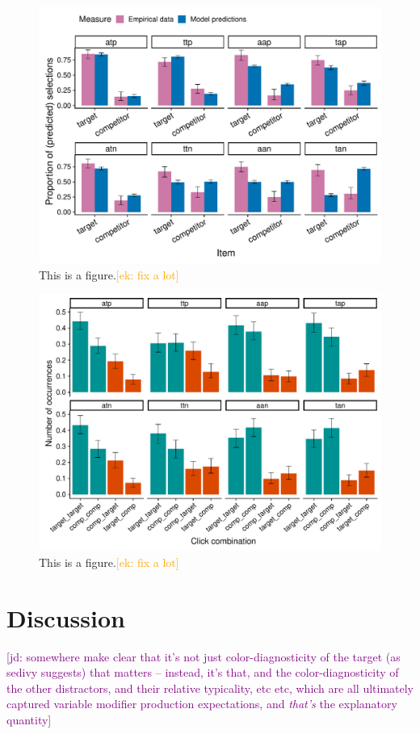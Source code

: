 \documentclass[10pt,letterpaper]{article}
\newcommand{\ek}[1]{\textcolor{Orange}{[ek: #1]}}
\newcommand{\jd}[1]{\textcolor{Purple}{[jd: #1]}}
\begin{document}
\begin{figure}
	\begin{center}
		\includegraphics[width=.475\textwidth]{graphs/modelflat-bycondition-targetprevClick.pdf}
	\end{center}
\caption{This is a figure.\ek{fix a lot}} 
\label{model-results-flatprior-targetprev}
\end{figure}

\begin{figure}
	\begin{center}
		\includegraphics[width=.475\textwidth]{graphs/switching-bycond.pdf}
	\end{center}
\caption{This is a figure.\ek{fix a lot}} 
\label{switching}
\end{figure}



\section{Discussion}

\jd{somewhere make clear that it's not just color-diagnosticity of the target (as sedivy suggests) that matters -- instead, it's that, and the color-diagnosticity of the other distractors, and their relative typicality, etc etc, which are all ultimately captured variable modifier production expectations, and \emph{that's} the explanatory quantity}

\end{document}

